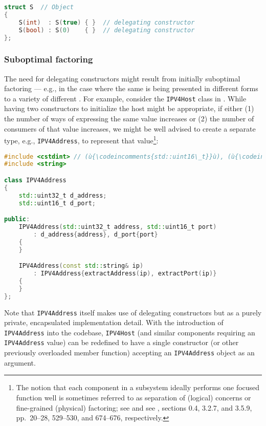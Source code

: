 \begin{lstlisting}[language=C++]
struct S  // Object
{
    S(int)  : S(true) { }  // delegating constructor
    S(bool) : S(0)    { }  // delegating constructor
};
\end{lstlisting}

\subsubsection[Suboptimal factoring]{Suboptimal factoring}\label{suboptimal-factoring}

The need for delegating constructors might result from initially
suboptimal factoring --- e.g., in the case where the same 
is being presented in different forms to a variety of different
. For example, consider the \lstinline!IPV4Host! class
in . %
While having two constructors to
initialize the host might be appropriate, if either (1) the number of
ways of expressing the same value increases or (2) the number of
consumers of that value increases, we might be well advised to create a
separate  type, e.g., \lstinline!IPV4Address!, to
represent that value{\cprotect\footnote{The notion that each component
in a subsystem ideally performs one focused function well is sometimes
referred to as separation of (logical) concerns or
  fine-grained (physical) factoring; see \cite{dijkstra82} and see \cite{lakos20},
  sections 0.4, 3.2.7, and 3.5.9, pp.~20--28, 529--530, and 674--676,
  respectively.}}:

\begin{lstlisting}[language=C++]
#include <cstdint> // (ù{\codeincomments{std::uint16\_t}}ù), (ù{\codeincomments{std::uint32\_t}}ù)
#include <string>

class IPV4Address
{
    std::uint32_t d_address;
    std::uint16_t d_port;

public:
    IPV4Address(std::uint32_t address, std::uint16_t port)
        : d_address{address}, d_port{port}
    {
    }

    IPV4Address(const std::string& ip)
        : IPV4Address{extractAddress(ip), extractPort(ip)}
    {
    }
};
\end{lstlisting}

\noindent Note that \lstinline!IPV4Address! itself makes use of delegating
constructors but as a purely private, encapsulated implementation
detail. With the introduction of \lstinline!IPV4Address! into the codebase,
\lstinline!IPV4Host! (and similar components requiring an
\lstinline!IPV4Address! value) can be redefined to have a single
constructor (or other previously overloaded member function) accepting
an \lstinline!IPV4Address! object as an argument.

